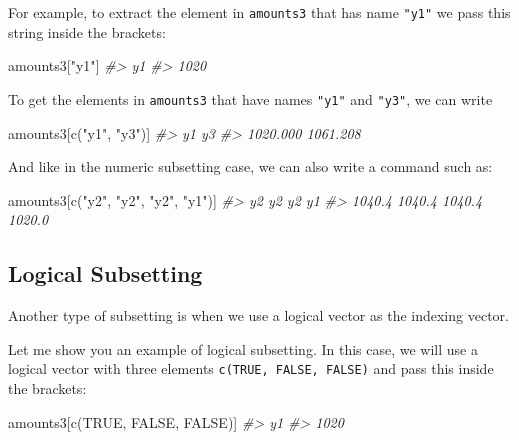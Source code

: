 \documentclass[
]{book}
\newenvironment{Shaded}{\begin{snugshade}}{\end{snugshade}}
\newcommand{\CommentTok}[1]{\textcolor[rgb]{0.56,0.35,0.01}{\textit{#1}}}
\newcommand{\ConstantTok}[1]{\textcolor[rgb]{0.00,0.00,0.00}{#1}}
\newcommand{\FunctionTok}[1]{\textcolor[rgb]{0.00,0.00,0.00}{#1}}
\newcommand{\NormalTok}[1]{#1}
\newcommand{\StringTok}[1]{\textcolor[rgb]{0.31,0.60,0.02}{#1}}
\begin{document}
For example, to extract the element in \texttt{amounts3} that has name \texttt{"y1"} we pass
this string inside the brackets:

\begin{Shaded}
\begin{Highlighting}[]
\NormalTok{amounts3[}\StringTok{"y1"}\NormalTok{]}
\CommentTok{\#\textgreater{}   y1 }
\CommentTok{\#\textgreater{} 1020}
\end{Highlighting}
\end{Shaded}

To get the elements in \texttt{amounts3} that have names \texttt{"y1"} and \texttt{"y3"}, we can
write

\begin{Shaded}
\begin{Highlighting}[]
\NormalTok{amounts3[}\FunctionTok{c}\NormalTok{(}\StringTok{"y1"}\NormalTok{, }\StringTok{"y3"}\NormalTok{)]}
\CommentTok{\#\textgreater{}       y1       y3 }
\CommentTok{\#\textgreater{} 1020.000 1061.208}
\end{Highlighting}
\end{Shaded}

And like in the numeric subsetting case, we can also write a command such as:

\begin{Shaded}
\begin{Highlighting}[]
\NormalTok{amounts3[}\FunctionTok{c}\NormalTok{(}\StringTok{"y2"}\NormalTok{, }\StringTok{"y2"}\NormalTok{, }\StringTok{"y2"}\NormalTok{, }\StringTok{"y1"}\NormalTok{)]}
\CommentTok{\#\textgreater{}     y2     y2     y2     y1 }
\CommentTok{\#\textgreater{} 1040.4 1040.4 1040.4 1020.0}
\end{Highlighting}
\end{Shaded}

\hypertarget{logical-subsetting}{%
\subsection{Logical Subsetting}\label{logical-subsetting}}

Another type of subsetting is when we use a logical vector as the indexing
vector.

Let me show you an example of logical subsetting. In this case, we will use a
logical vector with three elements \texttt{c(TRUE,\ FALSE,\ FALSE)} and pass this
inside the brackets:

\begin{Shaded}
\begin{Highlighting}[]
\NormalTok{amounts3[}\FunctionTok{c}\NormalTok{(}\ConstantTok{TRUE}\NormalTok{, }\ConstantTok{FALSE}\NormalTok{, }\ConstantTok{FALSE}\NormalTok{)]}
\CommentTok{\#\textgreater{}   y1 }
\CommentTok{\#\textgreater{} 1020}
\end{Highlighting}
\end{Shaded}
\end{document}
